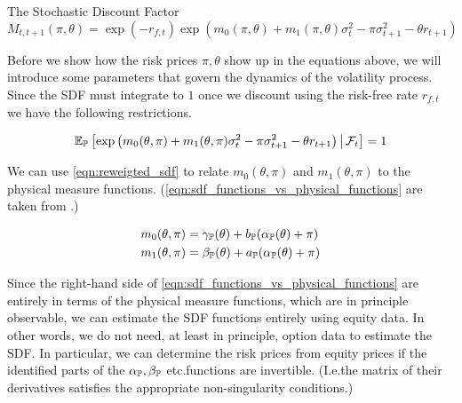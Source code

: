 \documentclass[11pt, letterpaper, twoside, final]{article}
\begin{document}
\begin{defn}{The Stochastic Discount Factor}
    \begin{equation}
        M_{t,t+1}(\pi, \theta) = \exp\left(-r_{f,t}\right) \exp\left(m_{0}(\pi, \theta) + m_1(\pi, \theta)
        \sigma_t^2 - \pi \sigma^2_{t+1} - \theta r_{t+1}\right) 
    \end{equation}
\end{defn}


Before we show how the risk prices $\pi, \theta$ show up in the equations above, we will introduce some parameters
that govern the dynamics of the volatility process.
Since the SDF must integrate to $1$ once we discount using the risk-free rate $r_{f,t}$\, we have the following
restrictions.


\begin{equation}
    \label{eqn:reweigted_sdf}
    \operatorname{\mathbb{E}}_{\mathbb{P}}\left[\exp\left(m_0(\theta, \pi) + m_1(\theta, \pi) \sigma^2_t - \pi \sigma^2_{t+1} - \theta r_{t+1}
    \right) \,\middle\vert\, \mathcal{F}_t \right] = 1 \\
\end{equation}


We can use \cref{eqn:reweigted_sdf} to relate $m_0(\theta, \pi)$ and $m_1(\theta, \pi)$ to the physical measure
functions. 
(\cref{eqn:sdf_functions_vs_physical_functions} are taken from \textcite[3.4]{khrapov2016affine}.)

\begin{align}
    \label{eqn:sdf_functions_vs_physical_functions}
    m_0(\theta, \pi)  &= \gamma_{\mathbb{P}}(\theta) + b_{\mathbb{P}}(\alpha_{\mathbb{P}}(\theta) + \pi) \\
    m_1(\theta, \pi)  &= \beta_{\mathbb{P}}(\theta) + a_{\mathbb{P}}(\alpha_{\mathbb{P}}(\theta) + \pi) \nonumber
\end{align}

Since the right-hand side of \cref{eqn:sdf_functions_vs_physical_functions} are entirely in terms of the physical
measure functions, which are in principle observable, we can estimate the SDF functions entirely using equity
data.
In other words, we do not need, at least in principle, option data to estimate the SDF.
In particular, we can determine the risk prices from equity prices if the identified parts of the $\alpha_{\mathbb{P}},
\beta_{\mathbb{P}}$ etc.\@ functions are  invertible.
(I.e.\@ the matrix of their derivatives satisfies the appropriate non-singularity conditions.)
\end{document}
